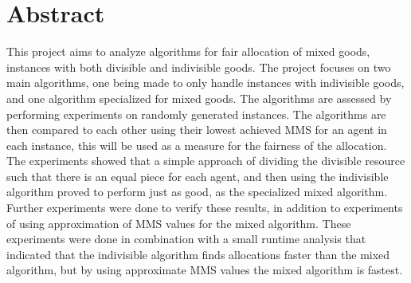\chapter{Abstract}\label{chp:abstract}

This project aims to analyze algorithms for fair allocation of mixed goods, instances with both divisible and indivisible goods. The project focuses on two main algorithms, one being made to only handle instances with indivisible goods, and one algorithm specialized for mixed goods. The algorithms are assessed by performing experiments on randomly generated instances. The algorithms are then compared to each other using their lowest achieved MMS for an agent in each instance, this will be used as a measure for the fairness of the allocation. The experiments showed that a simple approach of dividing the divisible resource such that there is an equal piece for each agent, and then using the indivisible algorithm proved to perform just as good, as the specialized mixed algorithm. Further experiments were done to verify these results, in addition to experiments of using approximation of MMS values for the mixed algorithm. These experiments were done in combination with a small runtime analysis that indicated that the indivisible algorithm finds allocations faster than the mixed algorithm, but by using approximate MMS values the mixed algorithm is fastest.
